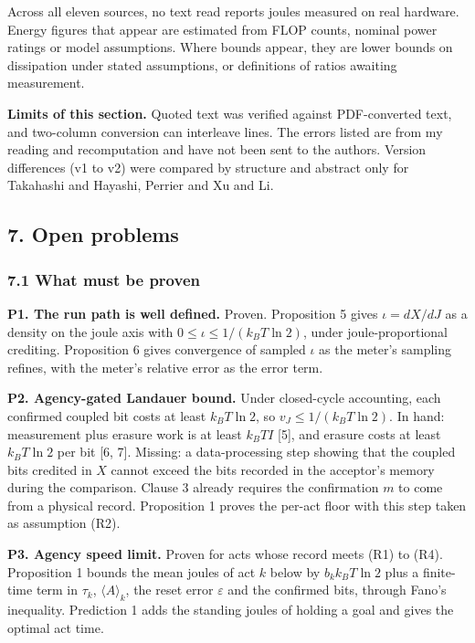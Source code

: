 \documentclass[
  10pt,
]{article}
\begin{document}
Across all eleven sources, no text read reports joules measured on real
hardware. Energy figures that appear are estimated from FLOP counts,
nominal power ratings or model assumptions. Where bounds appear, they
are lower bounds on dissipation under stated assumptions, or definitions
of ratios awaiting measurement.

\textbf{Limits of this section.} Quoted text was verified against
PDF-converted text, and two-column conversion can interleave lines. The
errors listed are from my reading and recomputation and have not been
sent to the authors. Version differences (v1 to v2) were compared by
structure and abstract only for Takahashi and Hayashi, Perrier and Xu
and Li.

\subsection{7. Open problems}\label{open-problems}

\subsubsection{7.1 What must be proven}\label{what-must-be-proven}

\textbf{P1. The run path is well defined.} Proven. Proposition 5 gives
\(\iota = dX/dJ\) as a density on the joule axis with
\(0 \le \iota \le 1/(k_B T\ln 2)\), under joule-proportional crediting.
Proposition 6 gives convergence of sampled \(\iota\) as the meter's
sampling refines, with the meter's relative error as the error term.

\textbf{P2. Agency-gated Landauer bound.} Under closed-cycle accounting,
each confirmed coupled bit costs at least \(k_B T \ln 2\), so
\(v_J \le 1/(k_B T \ln 2)\). In hand: measurement plus erasure work is
at least \(k_B T I\) {[}5{]}, and erasure costs at least \(k_B T \ln 2\)
per bit {[}6, 7{]}. Missing: a data-processing step showing that the
coupled bits credited in \(X\) cannot exceed the bits recorded in the
acceptor's memory during the comparison. Clause 3 already requires the
confirmation \(m\) to come from a physical record. Proposition 1 proves
the per-act floor with this step taken as assumption (R2).

\textbf{P3. Agency speed limit.} Proven for acts whose record meets (R1)
to (R4). Proposition 1 bounds the mean joules of act \(k\) below by
\(b_k k_B T\ln 2\) plus a finite-time term in \(\tau_k\),
\(\langle A\rangle_k\), the reset error \(\varepsilon\) and the
confirmed bits, through Fano's inequality. Prediction 1 adds the
standing joules of holding a goal and gives the optimal act time.
\end{document}
